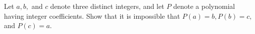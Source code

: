 Let $ a,b,$ and $ c$ denote three distinct integers, and let $ P$ denote a polynomial having integer coefficients. Show that it is impossible that $ P(a) = b, P(b) = c,$ and $ P(c) = a$.